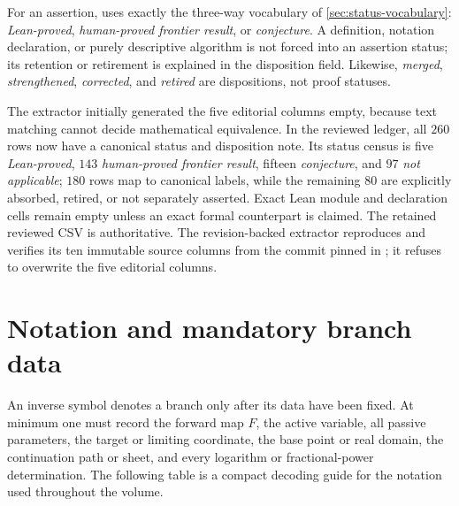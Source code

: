 For an assertion,  uses exactly the three-way
vocabulary of \cref{sec:status-vocabulary}:
\emph{Lean-proved}, \emph{human-proved frontier result}, or
\emph{conjecture}.  A definition, notation declaration, or purely descriptive
algorithm is not forced into an assertion status; its retention or retirement
is explained in the disposition field.  Likewise, \emph{merged},
\emph{strengthened}, \emph{corrected}, and \emph{retired} are dispositions,
not proof statuses.

The extractor initially generated the five editorial columns empty, because
text matching cannot decide mathematical equivalence.  In the reviewed
ledger, all \(260\) rows now have a canonical status and disposition note.  Its
status census is five \emph{Lean-proved}, \(143\)
\emph{human-proved frontier result}, fifteen \emph{conjecture}, and \(97\)
\emph{not applicable}; \(180\) rows map to canonical labels, while the
remaining \(80\) are explicitly absorbed, retired, or not separately asserted.
Exact Lean module and declaration cells remain empty unless an exact formal
counterpart is claimed.
The retained reviewed CSV is authoritative.  The revision-backed extractor
 reproduces and verifies its ten
immutable source columns from the commit pinned in
; it refuses to overwrite the five editorial
columns.

\section{Notation and mandatory branch data}
\label{sec:ref-notation}

An inverse symbol denotes a branch only after its data have been fixed.  At
minimum one must record the forward map \(F\), the active variable, all passive
parameters, the target or limiting coordinate, the base point or real domain,
the continuation path or sheet, and every logarithm or fractional-power
determination.  The following table is a compact decoding guide for the
notation used throughout the volume.

